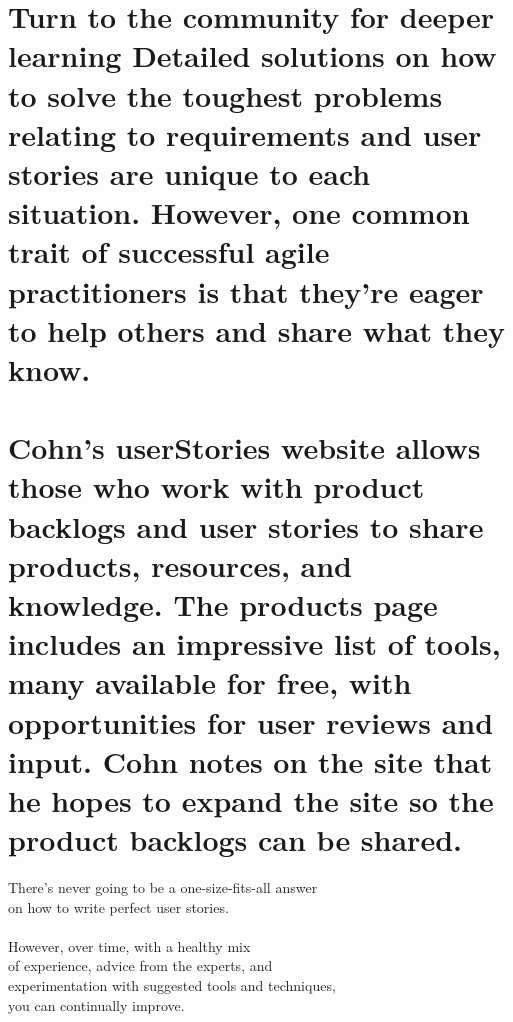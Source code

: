 \section{Turn to the community for deeper learning
Detailed solutions on how to solve the toughest problems relating to requirements and user stories are unique to each situation. However, one common trait of successful agile practitioners is that they're eager to help others and share what they know.}

\section{Cohn's userStories website allows those who work with product backlogs and user stories to share products, resources, and knowledge. The products page includes an impressive list of tools, many available for free, with opportunities for user reviews and input. Cohn notes on the site that he hopes to expand the site so the product backlogs can be shared.}
\newline
\huge
\parbox{\textwidth}{
	There's never going to be a one-size-fits-all answer \\on how to write perfect user stories. 
	\\ 
	\\ However, over time, with a healthy mix
	\\ of experience, advice from the experts, and  
	\\ experimentation with suggested tools and techniques, \\ you can continually improve.}


 